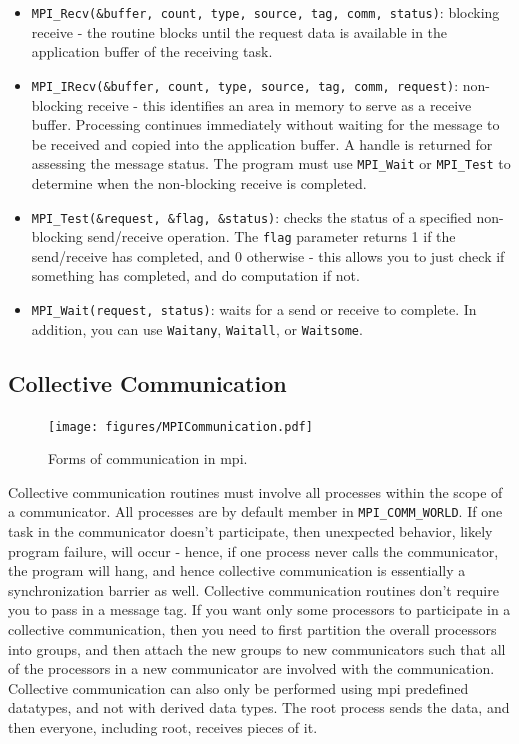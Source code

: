 \documentclass[10pt]{article}
\begin{document}
\begin{flushleft}
\begin{itemize}
\item {\tt MPI\_Recv(\&buffer, count, type, source, tag, comm, status)}: blocking receive - the routine blocks until the request data is available in the application buffer of the receiving task. 
\item {\tt MPI\_IRecv(\&buffer, count, type, source, tag, comm, request)}: non-blocking receive - this identifies an area in memory to serve as a receive buffer. Processing continues immediately without waiting for the message to be received and copied into the application buffer. A handle is returned for assessing the message status. The program must use {\tt MPI\_Wait} or {\tt MPI\_Test} to determine when the non-blocking receive is completed. 
\item {\tt MPI_Test(\&request, \&flag, \&status)}: checks the status of a specified non-blocking send/receive operation. The {\tt flag} parameter returns 1 if the send/receive has completed, and 0 otherwise - this allows you to just check if something has completed, and do computation if not.
\item {\tt MPI\_Wait(request, status)}: waits for a send or receive to complete. In addition, you can use {\tt Waitany}, {\tt Waitall}, or {\tt Waitsome}.
\end{itemize}

\subsection{Collective Communication}

\begin{figure}[H]
\centering
\texttt{[image: figures/MPICommunication.pdf]}
\caption{Forms of communication in \gls{mpi}.}
\end{figure}

Collective communication routines must involve all processes within the scope of a communicator. All processes are by default member in {\tt MPI\_COMM\_WORLD}. If one task in the communicator doesn't participate, then unexpected behavior, likely program failure, will occur - hence, if one process never calls the communicator, the program will hang, and hence collective communication is essentially a synchronization barrier as well. Collective communication routines don't require you to pass in a message tag. If you want only some processors to participate in a collective communication, then you need to first partition the overall processors into groups, and then attach the new groups to new communicators such that all of the processors in a new communicator are involved with the communication. Collective communication can also only be performed using \gls{mpi} predefined datatypes, and not with derived data types. The root process sends the data, and then everyone, including root, receives pieces of it.


\end{flushleft}
\end{document}
